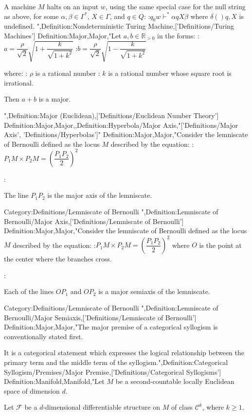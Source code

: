 A machine $M$ halts on an input $w$, using the same special case for the null string as above,  for some $\alpha, \beta \in \Gamma^*$, $X \in \Gamma$, and $q \in Q$:
:$q_0 w \vdash^* \alpha q X \beta$
where $\delta \left(   \right){q, X}$ is undefined.
",Definition:Nondeterministic Turing Machine,['Definitions/Turing Machines']
Definition:Major,Major,"Let $a, b \in \mathbb R_{>0}$ in the forms:
:$a = \dfrac \rho {\sqrt 2} \sqrt {1 + \dfrac k {\sqrt {1 + k^2} } }$
:$b = \dfrac \rho {\sqrt 2} \sqrt {1 - \dfrac k {\sqrt {1 + k^2} } }$

where:
: $\rho$ is a rational number
: $k$ is a rational number whose square root is irrational.


Then $a + b$ is a major.


",Definition:Major (Euclidean),['Definitions/Euclidean Number Theory']
Definition:Major,Major,,Definition:Hyperbola/Major Axis,"['Definitions/Major Axis', 'Definitions/Hyperbolas']"
Definition:Major,Major,"Consider the lemniscate of Bernoulli defined as the locus $M$ described by the equation:
:$P_1 M \times P_2 M = \left( \dfrac {P_1 P_2} 2 \right)^2$


:


The line $P_1 P_2$ is the major axis of the lemniscate.


Category:Definitions/Lemniscate of Bernoulli
",Definition:Lemniscate of Bernoulli/Major Axis,['Definitions/Lemniscate of Bernoulli']
Definition:Major,Major,"Consider the lemniscate of Bernoulli defined as the locus $M$ described by the equation:
:$P_1 M \times P_2 M = \left( \dfrac {P_1 P_2} 2 \right)^2$
where $O$ is the point at the center where the branches cross.


:


Each of the lines $O P_1$ and $O P_2$ is a major semiaxis of the lemniscate.


Category:Definitions/Lemniscate of Bernoulli
",Definition:Lemniscate of Bernoulli/Major Semiaxis,['Definitions/Lemniscate of Bernoulli']
Definition:Major,Major,"The major premise of a categorical syllogism is conventionally stated first.

It is a categorical statement which expresses the logical relationship between the primary term and the middle term of the syllogism.",Definition:Categorical Syllogism/Premises/Major Premise,['Definitions/Categorical Syllogisms']
Definition:Manifold,Manifold,"Let $M$ be a second-countable locally Euclidean space of dimension $d$. 

Let $\mathscr F$ be a $d$-dimensional differentiable structure on $M$ of class $\mathcal C^k$, where $k \ge 1$.


